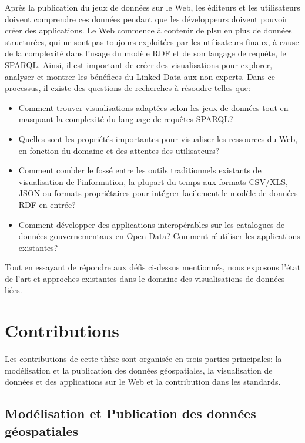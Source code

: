 \documentclass[a4paper,11pt,twoside]{report}
\begin{document}
 
Après la publication du jeux de données sur le Web, les éditeurs et les utilisateurs doivent comprendre ces données pendant que les développeurs doivent pouvoir créer des applications. Le Web commence à contenir de plsu en plus de données structurées, qui ne sont pas toujours exploitées par les utilisateurs finaux, à cause de la complexité dans l'usage du modèle RDF et de son langage de requête, le SPARQL. Ainsi, il est important de créer des visualisations pour explorer, analyser et montrer les bénéfices du Linked Data aux non-experts. Dans ce processus, il existe des questions de recherches à résoudre telles que:

\begin{itemize}
\item Comment trouver visualisations adaptées selon les jeux de données tout en masquant la complexité du language de requêtes SPARQL?

 \item  Quelles sont les propriétés importantes pour visualiser les ressources du Web, en fonction du domaine et des attentes des utilisateurs?
 
 \item  Comment combler le fossé entre les outils traditionnels existants de visualisation de l'information, la plupart du temps aux formats CSV/XLS, JSON ou formats propriétaires pour intégrer facilement le modèle de données RDF en entrée?
 
 \item Comment développer des applications interopérables sur les catalogues de données gouvernementaux en  Open Data? Comment réutiliser les applications existantes?
 
\end{itemize}
 
 
Tout en essayant de répondre aux défis ci-dessus mentionnés, nous exposons  l'état de l'art et approches existantes dans le domaine des visualisations de données liées.

\section*{Contributions}
\label{sec:contributions}


Les contributions de cette thèse sont organisée en trois parties principales: la modélisation et la publication des données géospatiales, la visualisation de données et des applications sur le Web et la contribution dans les standards.

\subsection*{Modélisation et Publication des données géospatiales}
\end{document}
